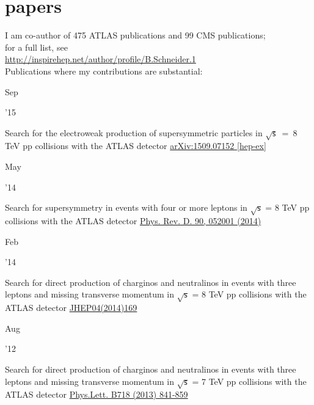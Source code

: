 \documentclass[]{cv} %
\begin{document}
\section{papers}
\begin{entrylist}

  \entry
  {}
  {I am co-author of 475 ATLAS publications and 99 CMS publications;\\
  for a full list, see \\
    \href{http://inspirehep.net/author/profile/B.Schneider.1}{http://inspirehep.net/author/profile/B.Schneider.1}\\
  Publications where my contributions are substantial:}
  {}
  {\vspace*{\spacingPubs}}

  \entry
  {\parbox[t]{\parboxWidthOne}{Sep}\parbox[t]{\parboxWidthTwo}{\hfill '15}}
  {Search for the electroweak production of supersymmetric particles in
    $\sqrt{\mathsf{s}}$~=~8 TeV pp collisions with the ATLAS detector} 
    {\href{http://arxiv.org/abs/1509.07152}{arXiv:1509.07152 [hep-ex]}}
  {\vspace*{\spacingPubs}}

  \entry
  {\parbox[t]{\parboxWidthOne}{May}\parbox[t]{\parboxWidthTwo}{\hfill '14}}
  {Search for supersymmetry in events with four or more leptons in $\sqrt{\mathsf{s}}$ = 8 TeV pp collisions with the ATLAS detector}
  {\href{http://link.aps.org/doi/10.1103/PhysRevD.90.052001}{Phys. Rev. D. 90, 052001 (2014)}}
  {\vspace*{\spacingPubs}}

  \entry
  {\parbox[t]{\parboxWidthOne}{Feb}\parbox[t]{\parboxWidthTwo}{\hfill '14}}
  {Search for direct production of charginos and neutralinos in events with three leptons and missing transverse momentum in $\sqrt{\mathsf{s}}$ =
8 TeV pp collisions with the ATLAS detector}
{\href{http://dx.doi.org/10.1007/JHEP04(2014)169}{JHEP04(2014)169}}
{\vspace*{\spacingPubs}}

    \entry
    {\parbox[t]{\parboxWidthOne}{Aug}\parbox[t]{\parboxWidthTwo}{\hfill '12}}
    {Search for direct production of charginos and neutralinos in events with three leptons and missing transverse momentum in $\sqrt{\mathsf{s}}$ =
  7 TeV pp collisions with the ATLAS detector}
  {\href{http://dx.doi.org/10.1016/j.physletb.2012.11.039}{Phys.Lett. B718 (2013) 841-859}}
  {\vspace*{\spacingPubs}}

\end{entrylist}
\end{document}
